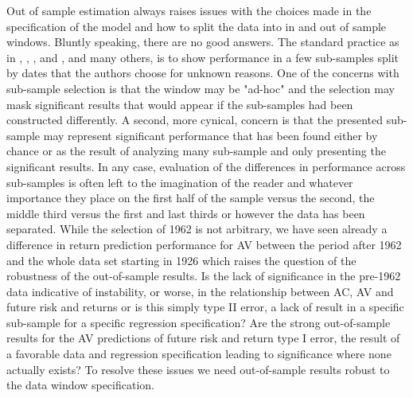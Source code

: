 Out of sample estimation always raises issues with the choices made in the specification of the model and how to split the data into in and out of sample windows. 
Bluntly speaking, there are no good answers. The standard practice as in \citet{Rapach2013}, \citet{Rapach2010}, \citet{Rapach2016}, and \cite{Huang2015}, and many others, is to show performance in a few sub-samples split by dates that the authors choose for unknown reasons. One of the concerns with sub-sample selection is that the window may be "ad-hoc" and the selection may mask significant results that would appear if the sub-samples had been constructed differently. A second, more cynical, concern is that the presented sub-sample may represent significant performance that has been found either by chance or as the result of analyzing many sub-sample and only presenting the significant results. In any case, evaluation of the differences in performance across sub-samples is often left to the imagination of the reader and whatever importance they place on the first half of the sample versus the second, the middle third versus the first and last thirds or however the data has been separated. While the selection of 1962 is not arbitrary, we have seen already a difference in return prediction performance for AV between the period after 1962 and the whole data set starting in 1926 which raises the question of the robustness of the out-of-sample results. Is the lack of significance in the pre-1962 data indicative of instability, or worse, in the relationship between AC, AV and future risk and returns or is this simply type II error, a lack of result in a specific sub-sample for a specific regression specification? Are the strong out-of-sample results for the AV predictions of future risk and return type I error, the result of a favorable data and regression specification leading to significance where none actually exists? To resolve these issues we need out-of-sample results robust to the data window specification. 

